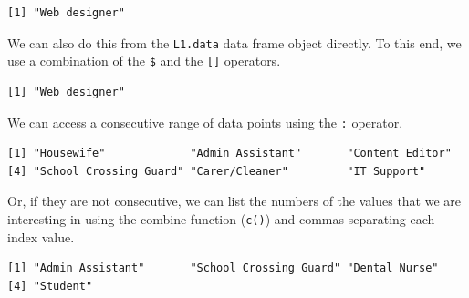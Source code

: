 \documentclass[
  letterpaper,
  DIV=11,
  numbers=noendperiod]{scrreprt}
\newenvironment{Shaded}{\begin{snugshade}}{\end{snugshade}}
\newcommand{\DecValTok}[1]{\textcolor[rgb]{0.68,0.00,0.00}{#1}}
\newcommand{\FunctionTok}[1]{\textcolor[rgb]{0.28,0.35,0.67}{#1}}
\newcommand{\NormalTok}[1]{\textcolor[rgb]{0.00,0.23,0.31}{#1}}
\newcommand{\SpecialCharTok}[1]{\textcolor[rgb]{0.37,0.37,0.37}{#1}}
\begin{document}
\begin{verbatim}
[1] "Web designer"
\end{verbatim}

We can also do this from the \texttt{L1.data} data frame object
directly. To this end, we use a combination of the \texttt{\$} and the
\texttt{{[}{]}} operators.

\begin{Shaded}
\end{Shaded}

\begin{verbatim}
[1] "Web designer"
\end{verbatim}

We can access a consecutive range of data points using the \texttt{:}
operator.

\begin{Shaded}
\end{Shaded}

\begin{verbatim}
[1] "Housewife"             "Admin Assistant"       "Content Editor"       
[4] "School Crossing Guard" "Carer/Cleaner"         "IT Support"           
\end{verbatim}

Or, if they are not consecutive, we can list the numbers of the values
that we are interesting in using the combine function (\texttt{c()}) and
commas separating each index value.

\begin{Shaded}
\end{Shaded}

\begin{verbatim}
[1] "Admin Assistant"       "School Crossing Guard" "Dental Nurse"         
[4] "Student"              
\end{verbatim}
\end{document}
